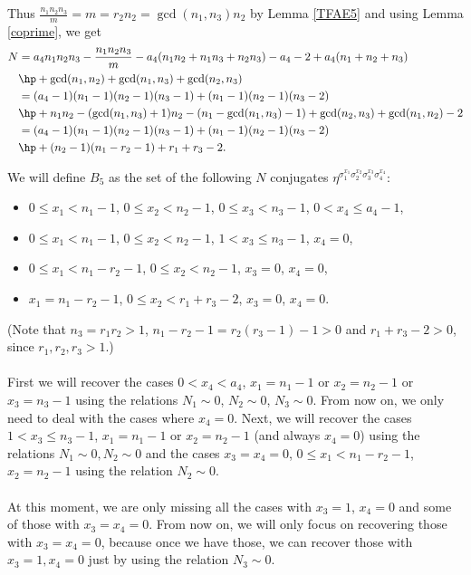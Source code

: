 Thus $\frac{n_1n_2n_3}{m}=m=r_2n_2=\gcd(n_1,n_3)n_2$ by Lemma \ref{TFAE5} and using Lemma \ref{coprime}, we get
\begin{align*}
N&=a_4n_1n_2n_3-\frac{n_1n_2n_3}{m}-a_4(n_1n_2+n_1n_3+n_2n_3)-a_4-2+a_4(n_1+n_2+n_3)\\
&\hp+\gcd(n_1,n_2)+\gcd(n_1,n_3)+\gcd(n_2,n_3)\\
&=(a_4-1)(n_1-1)(n_2-1)(n_3-1)+(n_1-1)(n_2-1)(n_3-2)\\
&\hp+n_1n_2-(\gcd(n_1,n_3)+1)n_2-(n_1-\gcd(n_1,n_3)-1)+\gcd(n_2,n_3)+\gcd(n_1,n_2)-2\\
&=(a_4-1)(n_1-1)(n_2-1)(n_3-1)+(n_1-1)(n_2-1)(n_3-2)\\
&\hp+(n_2-1)(n_1-r_2-1)+r_1+r_3-2.
\end{align*}

We will define $B_5$ as the set of the following $N$ conjugates $\eta^{\sigma_1^{x_1}\sigma_2^{x_2}\sigma_3^{x_3}\sigma_4^{x_4}}$:
\begin{itemize}
\item $0\leq x_1<n_1-1$, $ 0\leq x_2<n_2-1$, $ 0\leq x_3<n_3-1$, $ 0<x_4\leq a_4-1$,
\item $0\leq x_1<n_1-1$, $ 0\leq x_2<n_2-1$, $ 1< x_3 \leq n_3-1$, $ x_4=0$,
\item $0\leq x_1< n_1-r_2-1$, $ 0\leq x_2<n_2-1$, $ x_3=0$, $ x_4=0$,
\item           $x_1=n_1-r_2-1$, $ 0\leq x_2<r_1+r_3-2$, $ x_3=0$, $ x_4=0$.
\end{itemize}
(Note that $n_3=r_1r_2>1$, $n_1-r_2-1=r_2(r_3-1)-1> 0$ and $r_1+r_3-2>0$, since $r_1,r_2,r_3>1$.)

\paragraph*{}
First we will recover the cases $0<x_4<a_4$, $x_1=n_1-1$ or $x_2=n_2-1$ or $x_3=n_3-1$ using the relations $N_1\sim 0$, $N_2\sim 0$, $N_3\sim 0$. From now on, we only need to deal with the cases where $x_4=0$. Next, we will recover the cases $1< x_3 \leq n_3-1$, $x_1=n_1-1$ or $x_2=n_2-1$ (and always $x_4=0$) using the relations $N_1\sim 0, N_2\sim 0$ and the cases $x_3=x_4=0$, $0\leq x_1< n_1-r_2-1$, $x_2=n_2-1$ using the relation $N_2\sim 0$.
\paragraph*{}
At this moment, we are only missing all the cases with $x_3=1$, $x_4=0$ and some of those with $x_3=x_4=0$. From now on, we will only focus on recovering those with $x_3=x_4=0$, because once we have those, we can recover those with $x_3=1,x_4=0$ just by using the relation $N_3\sim 0$.
